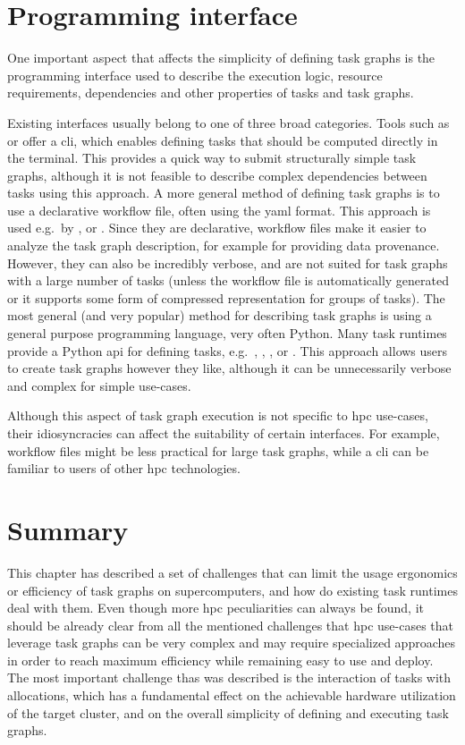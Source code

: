 \section{Programming interface}
One important aspect that affects the simplicity of defining task graphs is the programming
interface used to describe the execution logic, resource requirements, dependencies and other
properties of tasks and task graphs.

Existing interfaces usually belong to one of three broad categories. Tools such as
\gnuparallel{} or \hypershell{} offer a \gls{cli}, which enables
defining tasks that should be computed directly in the terminal. This provides a quick way to
submit structurally simple task graphs, although it is not feasible to describe complex
dependencies between tasks using this approach. A more general method of defining task graphs is to
use a declarative workflow file, often using the \gls{yaml} format. This approach is
used e.g.\ by \pegasus{}, \autosubmit{} or \merlin{}. Since
they are declarative, workflow files make it easier to analyze the task graph description, for
example for providing data provenance. However, they can also be incredibly verbose, and are not
suited for task graphs with a large number of tasks (unless the workflow file is automatically
generated or it supports some form of compressed representation for groups of tasks). The most
general (and very popular) method for describing task graphs is using a general purpose programming
language, very often Python. Many task runtimes provide a Python \gls{api} for
defining tasks, e.g.\ \dask{}, \ray{}, \parsl{},
\balsam{} or \pegasus{}. This approach allows users to create task
graphs however they like, although it can be unnecessarily verbose and complex for simple
use-cases.

Although this aspect of task graph execution is not specific to \gls{hpc} use-cases,
their idiosyncracies can affect the suitability of certain interfaces. For example, workflow files
might be less practical for large task graphs, while a \gls{cli} can be familiar to
users of other \gls{hpc} technologies.

\section*{Summary}
This chapter has described a set of challenges that can limit the usage ergonomics or efficiency of
task graphs on supercomputers, and how do existing task runtimes deal with them. Even though more
\gls{hpc} peculiarities can always be found, it should be already clear from all the
mentioned challenges that \gls{hpc} use-cases that leverage task graphs can be very
complex and may require specialized approaches in order to reach maximum efficiency while remaining
easy to use and deploy. The most important challenge thas was described is the interaction of tasks
with allocations, which has a fundamental effect on the achievable hardware utilization of the
target cluster, and on the overall simplicity of defining and executing task graphs.

